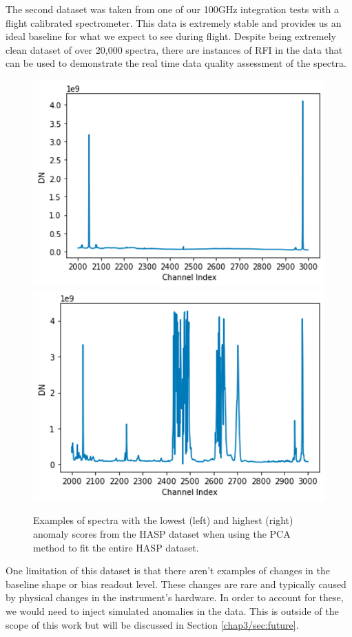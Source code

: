 The second dataset was taken from one of our 100GHz integration tests with a flight calibrated spectrometer. 
This data is extremely stable and provides us an ideal baseline for what we expect to see during flight.
Despite being extremely clean dataset of over 20,000 spectra, there are instances of RFI in the data that can be used to demonstrate the real time data quality assessment of the spectra. 

\begin{figure}
    \centering
    \includegraphics[width=0.49\linewidth]{figs/3/hasp1.png}
    \includegraphics[width=0.49\linewidth]{figs/3/hasp2.png}
    \caption{Examples of spectra with the lowest (left) and highest (right) anomaly scores from the HASP dataset when using the PCA method to fit the entire HASP dataset.}
    \label{chap3/fig:hasp}
\end{figure}

One limitation of this dataset is that there aren't examples of changes in the baseline shape or bias readout level. 
These changes are rare and typically caused by physical changes in the instrument's hardware. 
In order to account for these, we would need to inject simulated anomalies in the data.
This is outside of the scope of this work but will be discussed in Section \ref{chap3/sec:future}.

